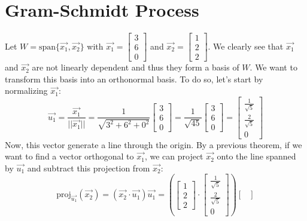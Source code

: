 \section{Gram-Schmidt Process}
\begin{eg}
    Let $W = \text{span}\{\vec{x_1}, \vec{x_2}\}$ with $\vec{x_1} = \begin{bmatrix}
        3 \\ 6 \\ 0
    \end{bmatrix}$ and $\vec{x_2} = \begin{bmatrix}
        1 \\ 2 \\ 2
    \end{bmatrix}$. We clearly see that $\vec{x_1}$ and $\vec{x_2}$ are not linearly dependent and thus they form a basis of $W$. We want to transform this basis into an orthonormal basis. To do so, let's start by normalizing $\vec{x_1}$:
    \[
        \vec{u_1} = \frac{\vec{x_1}}{||\vec{x_1}||} = \frac{1}{\sqrt{3^2 + 6^2 + 0^2}} \begin{bmatrix}
            3 \\ 6 \\ 0
        \end{bmatrix} = \frac{1}{\sqrt{45}} \begin{bmatrix}
            3 \\ 6 \\ 0
        \end{bmatrix} = \begin{bmatrix}
            \frac{1}{\sqrt{5}} \\ \frac{2}{\sqrt{5}} \\ 0
        \end{bmatrix}
    \]
    Now, this vector generate a line through the origin. By a previous theorem, if we want to find a vector orthogonal to $\vec{x_1}$, we can project $\vec{x_2}$ onto the line spanned by $\vec{u_1}$ and subtract this projection from $\vec{x_2}$:
    \[
        \text{proj}_{\vec{u_1}}(\vec{x_2}) = (\vec{x_2} \cdot \vec{u_1}) \vec{u_1} = \left( \begin{bmatrix}
            1 \\ 2 \\ 2
        \end{bmatrix} \cdot \begin{bmatrix}
            \frac{1}{\sqrt{5}} \\ \frac{2}{\sqrt{5}} \\ 0
        \end{bmatrix} \right) \begin{bmatrix}

\end{bmatrix}\]
\end{eg}
